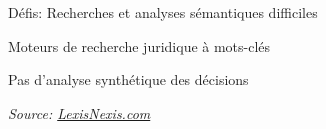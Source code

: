\documentclass[newPxFont,pagenumber]{beamer}
\begin{document}
\begin{frame}[t]{Défis: Recherches et analyses sémantiques difficiles}

Moteurs de recherche juridique à mots-clés 

Pas d'analyse synthétique des décisions 


\textit{\tiny{Source: \url{LexisNexis.com}}} 
\end{frame}
\end{document}
